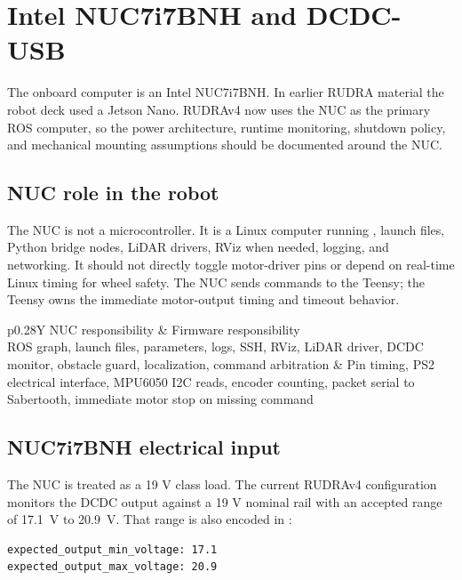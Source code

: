 
\chapter{Intel NUC7i7BNH and DCDC-USB}
\label{chap:nuc-dcdc}

The onboard computer is an Intel NUC7i7BNH.  In earlier RUDRA material the robot deck used a Jetson Nano.  RUDRAv4 now uses the NUC as the primary ROS computer, so the power architecture, runtime monitoring, shutdown policy, and mechanical mounting assumptions should be documented around the NUC.

\section{NUC role in the robot}
The NUC is not a microcontroller.  It is a Linux computer running \ros{}, launch files, Python bridge nodes, LiDAR drivers, RViz when needed, logging, and networking.  It should not directly toggle motor-driver pins or depend on real-time Linux timing for wheel safety.  The NUC sends commands to the Teensy; the Teensy owns the immediate motor-output timing and timeout behavior.

\begin{table}[h]
\centering
\caption{NUC responsibilities versus firmware responsibilities.}
\begin{tabularx}{\linewidth}{p{0.28\linewidth}Y}
\toprule
NUC responsibility & Firmware responsibility \\
\midrule
ROS graph, launch files, parameters, logs, SSH, RViz, LiDAR driver, DCDC monitor, obstacle guard, localization, command arbitration & Pin timing, PS2 electrical interface, MPU6050 I2C reads, encoder counting, packet serial to Sabertooth, immediate motor stop on missing command \\
\bottomrule
\end{tabularx}
\end{table}

\section{NUC7i7BNH electrical input}
The NUC is treated as a 19 V class load.  The current RUDRAv4 configuration monitors the DCDC output against a 19 V nominal rail with an accepted range of \SI{17.1}{\volt} to \SI{20.9}{\volt}.  That range is also encoded in :

\begin{lstlisting}[caption={NUC DCDC output range from RUDRAv4 hardware config.}]
expected_output_min_voltage: 17.1
expected_output_max_voltage: 20.9
\end{lstlisting}

